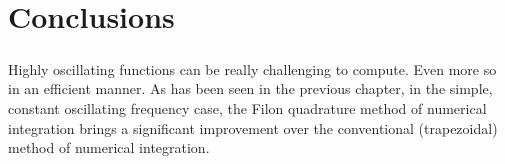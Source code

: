 \chapter{Conclusions}



\paragraph{} Highly oscillating functions can be really challenging to compute. Even more so in an efficient manner.
As has been seen in the previous chapter, in the simple, constant oscillating frequency case, the Filon quadrature method of numerical integration brings a significant improvement over the conventional (trapezoidal) method of numerical integration.
